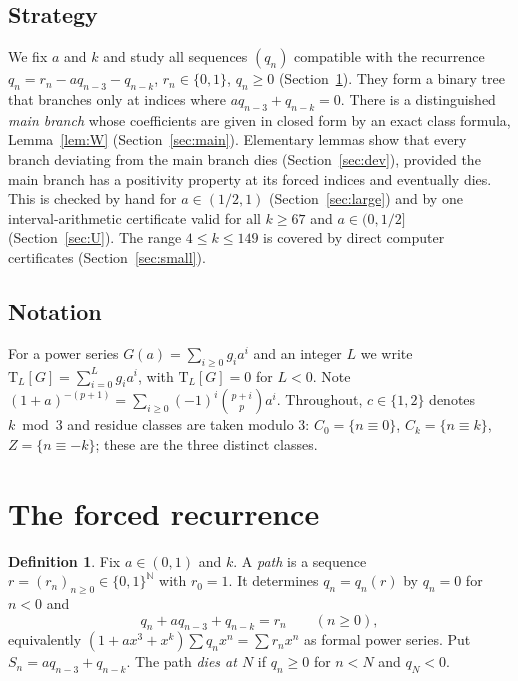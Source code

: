 \documentclass[11pt]{amsart}
\theoremstyle{definition}
\newtheorem{definition}[theorem]{Definition}
\theoremstyle{remark}
\newcommand{\Tr}{\mathrm{T}}
\newcommand{\Cz}{C_0}
\newcommand{\Ck}{C_k}
\begin{document}
\subsection*{Strategy}
We fix $a$ and $k$ and study all sequences $(q_n)$ compatible with the
recurrence $q_n=r_n-aq_{n-3}-q_{n-k}$, $r_n\in\{0,1\}$, $q_n\ge 0$
(Section~\ref{sec:setup}). They form a binary tree that branches only at indices
where $aq_{n-3}+q_{n-k}=0$. There is a distinguished \emph{main branch} whose
coefficients are given in closed form by an exact class formula, Lemma~\ref{lem:W}
(Section~\ref{sec:main}). Elementary lemmas show that every branch deviating from
the main branch dies (Section~\ref{sec:dev}), provided the main branch has a
positivity property at its forced indices and eventually dies. This is checked by
hand for $a\in(1/2,1)$ (Section~\ref{sec:large}) and by one interval-arithmetic
certificate valid for all $k\ge 67$ and $a\in(0,1/2]$ (Section~\ref{sec:U}). The
range $4\le k\le 149$ is covered by direct computer certificates
(Section~\ref{sec:small}).

\subsection*{Notation}
For a power series $G(a)=\sum_{i\ge 0} g_ia^i$ and an integer $L$ we write
$\Tr_L[G]=\sum_{i=0}^{L}g_ia^i$, with $\Tr_L[G]=0$ for $L<0$. Note
$(1+a)^{-(p+1)}=\sum_{i\ge 0}(-1)^i\binom{p+i}{p}a^i$. Throughout,
$c\in\{1,2\}$ denotes $k \bmod 3$ and residue classes are taken modulo $3$:
$\Cz=\{n\equiv 0\}$, $\Ck=\{n\equiv k\}$, $Z=\{n\equiv -k\}$; these are the three
distinct classes.

\section{The forced recurrence}\label{sec:setup}

\begin{definition}
Fix $a\in(0,1)$ and $k$. A \emph{path} is a sequence $r=(r_n)_{n\ge 0}\in\{0,1\}^{\mathbb{N}}$
with $r_0=1$. It determines $q_n=q_n(r)$ by $q_n=0$ for $n<0$ and
\begin{equation}\label{eq:rec}
q_n+aq_{n-3}+q_{n-k}=r_n\qquad(n\ge 0),
\end{equation}
equivalently $(1+ax^3+x^k)\sum q_nx^n=\sum r_nx^n$ as formal power series.
Put $S_n=aq_{n-3}+q_{n-k}$. The path \emph{dies at $N$} if $q_n\ge 0$ for
$n<N$ and $q_N<0$.
\end{definition}
\end{document}

